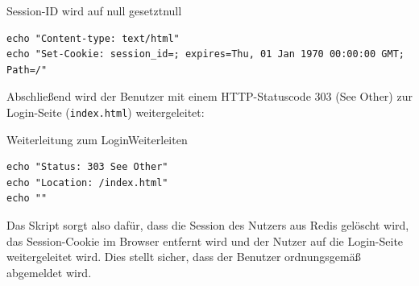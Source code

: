 \begin{code}{Session-ID wird auf null gesetzt}{null}
        \begin{verbatim}
echo "Content-type: text/html"
echo "Set-Cookie: session_id=; expires=Thu, 01 Jan 1970 00:00:00 GMT; Path=/"
  \end{verbatim}
\end{code}

Abschließend wird der Benutzer mit einem HTTP-Statuscode 303 (See Other) zur Login-Seite (\texttt{index.html}) weitergeleitet:

\begin{code}{Weiterleitung zum Login}{Weiterleiten}
        \begin{verbatim}
echo "Status: 303 See Other"
echo "Location: /index.html"
echo ""
  \end{verbatim}
\end{code}

Das Skript sorgt also dafür, dass die Session des Nutzers aus Redis gelöscht wird, das Session-Cookie im Browser entfernt wird und der Nutzer auf die Login-Seite weitergeleitet wird. Dies stellt sicher, dass der Benutzer ordnungsgemäß abgemeldet wird.

